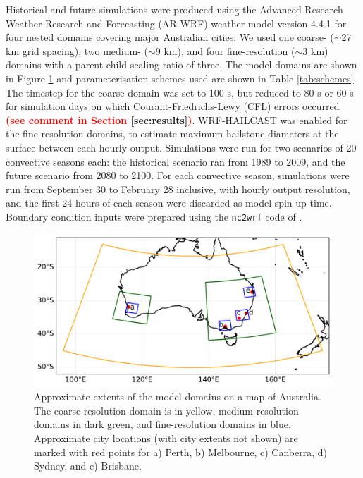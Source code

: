 \documentclass[]{agujournal2019}
\newcommand*{\todo}[1]{\textbf{\textcolor{red}{(#1)}}}
\begin{document}
Historical and future simulations were produced using the Advanced Research Weather Research and Forecasting (AR-WRF) weather model version 4.4.1 \cite{Skamarock_2021} for four nested domains covering major Australian cities. We used one coarse- ($\sim$27 km grid spacing), two medium- ($\sim$9 km), and four fine-resolution ($\sim$3 km) domains with a parent-child scaling ratio of three. The model domains are shown in Figure \ref{fig:domains} and parameterisation schemes used are shown in Table \ref{tab:schemes}. The timestep for the coarse domain was set to 100 s, but reduced to 80 s or 60 s for simulation days on which Courant-Friedrichs-Lewy (CFL) errors occurred \todo{see comment in Section \ref{sec:results}}. WRF-HAILCAST \cite{Adams-Selin_WF_2019} was enabled for the fine-resolution domains, to estimate maximum hailstone diameters at the surface between each hourly output. Simulations were run for two scenarios of 20 convective seasons each: the historical scenario ran from 1989 to 2009, and the future scenario from 2080 to 2100. For each convective season, simulations were run from September 30 to February 28 inclusive, with hourly output resolution, and the first 24 hours of each season were discarded as model spin-up time. Boundary condition inputs were prepared using the \texttt{nc2wrf} code of . 

\begin{figure}[h!]
      \noindent\includegraphics[width=\textwidth]{figures/domains}
      \caption{Approximate extents of the model domains on a map of Australia. The coarse-resolution domain is in yellow, medium-resolution domains in dark green, and fine-resolution domains in blue. Approximate city locations (with city extents not shown) are marked with red points for a) Perth, b) Melbourne, c) Canberra, d) Sydney, and e) Brisbane.}
      \label{fig:domains}
\end{figure}
\end{document}
